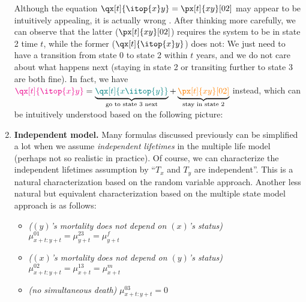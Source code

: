 \begin{enumerate}
Although the equation \(\qx[t]{\itop{x}y}=\px[t]{xy}[02]\) may appear to be
intuitively appealing, it is actually wrong \warn{}. After thinking more
carefully, we can observe that the latter (\(\px[t]{xy}[02]\)) requires the
system to be in state 2  time \(t\), while the former
(\(\qx[t]{\itop{x}y}\)) does not: We just need to have a transition from state
0 to state 2 within \(t\) years, and we do not care about what happens next
(staying in state 2 or transiting further to state 3 are both fine). In fact,
we have \(\mgc{\qx[t]{\itop{x}y}}=\underbrace{\tec{\qx[t]{x\iitop{y}}}}_{\text{go to state 3 next}}
+\underbrace{\orc{\px[t]{xy}[02]}}_{\text{stay in state 2}}\) instead,
which can be intuitively understood based on the following picture:
\begin{center}
\end{center}
\item\label{it:independent-life-fmlas} \textbf{Independent model.} Many
formulas discussed previously can be simplified a lot when we assume
\emph{independent lifetimes} in the multiple life model (perhaps not so
realistic in practice). Of course, we can characterize the independent
lifetimes assumption by ``\(T_x\) and \(T_y\) are independent''. This is a
natural characterization based on the random variable approach. Another less
natural but equivalent characterization based on the multiple state model
approach is as follows:
\begin{itemize}
\item \emph{(\((y)\)'s mortality does not depend on \((x)\)'s status)} \(\mu_{x+t:y+t}^{01}=\mu_{y+t}^{23}=\mu_{y+t}^{f}\)
\item \emph{(\((x)\)'s mortality does not depend on \((y)\)'s status)} \(\mu_{x+t:y+t}^{02}=\mu_{x+t}^{13}=\mu_{x+t}^{m}\)
\item \emph{(no simultaneous death)} \(\mu_{x+t:y+t}^{03}=0\)
\end{itemize}

\end{enumerate}
